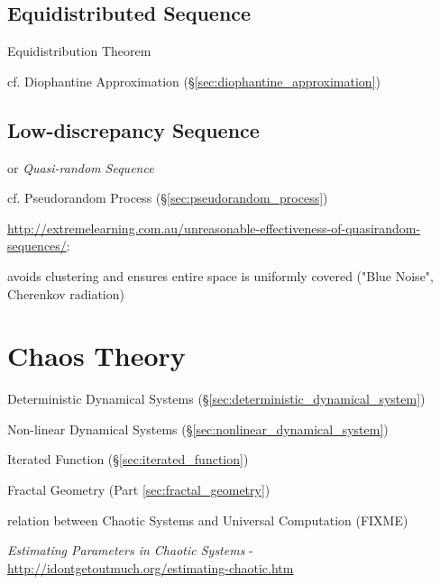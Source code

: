 \subsection{Equidistributed Sequence}\label{sec:equidistributed_sequence}


Equidistribution Theorem

cf. Diophantine Approximation (\S\ref{sec:diophantine_approximation})



\subsection{Low-discrepancy Sequence}\label{sec:low_discrepancy}

or \emph{Quasi-random Sequence}

cf. Pseudorandom Process (\S\ref{sec:pseudorandom_process})

\url{http://extremelearning.com.au/unreasonable-effectiveness-of-quasirandom-sequences/}:

avoids clustering and ensures entire space is uniformly covered ("Blue Noise",
Cherenkov radiation)



\section{Chaos Theory}\label{sec:chaos_theory}

Deterministic Dynamical Systems (\S\ref{sec:deterministic_dynamical_system})

Non-linear Dynamical Systems (\S\ref{sec:nonlinear_dynamical_system})

Iterated Function (\S\ref{sec:iterated_function})

Fractal Geometry (Part \ref{sec:fractal_geometry})

relation between Chaotic Systems and Universal Computation (FIXME)

\emph{Estimating Parameters in Chaotic Systems} -
\url{http://idontgetoutmuch.org/estimating-chaotic.htm}

